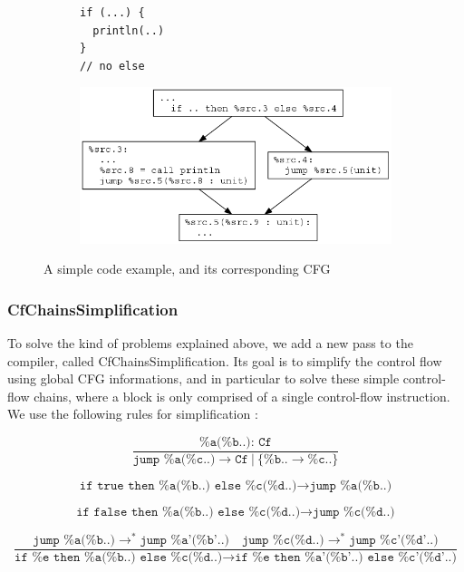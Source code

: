 \documentclass[11pt,a4paper]{article}
\newcommand{\scala}[1]{\textsf{#1}}
\newcommand{\nir}[1]{\texttt{#1}}
\begin{document}
\begin{figure}[h]
	\begin{subfigure}{0.5\textwidth}
		\begin{lstlisting}
if (...) {
  println(..)
}
// no else
		\end{lstlisting}
	\end{subfigure}
	\quad
	\begin{subfigure}{0.5\textwidth}
		\includegraphics[width=\textwidth]{images/cfc-cfg1.png}
	\end{subfigure}
	\caption{A simple code example, and its corresponding CFG}
	\label{fig:cfc}
\end{figure}

\subsubsection*{CfChainsSimplification}

To solve the kind of problems explained above, we add a new pass to the compiler, called \scala{CfChainsSimplification}. Its goal is to simplify the control flow using global CFG informations, and in particular to solve these simple control-flow chains, where a block is only comprised of a single control-flow instruction. We use the following rules for simplification :

$$ \frac{\nir{\%a(\%b..): Cf}}{\nir{jump \%a(\%c..)} \longrightarrow \nir{Cf} \  | \  \{\nir{\%b..} \rightarrow \nir{\%c..}\}} $$

$$ \nir{if true then \%a(\%b..) else \%c(\%d..)} \longrightarrow \nir{jump \%a(\%b..)} $$

$$ \nir{if false then \%a(\%b..) else \%c(\%d..)} \longrightarrow \nir{jump \%c(\%d..)} $$

$$ \frac{\nir{jump \%a(\%b..)} \longrightarrow^* \nir{jump \%a'(\%b'..)} \quad \nir{jump \%c(\%d..)} \longrightarrow^* \nir{jump \%c'(\%d'..)}}{\nir{if \%e then \%a(\%b..) else \%c(\%d..)} \longrightarrow \nir{if \%e then \%a'(\%b'..) else \%c'(\%d'..)}} $$
\end{document}
